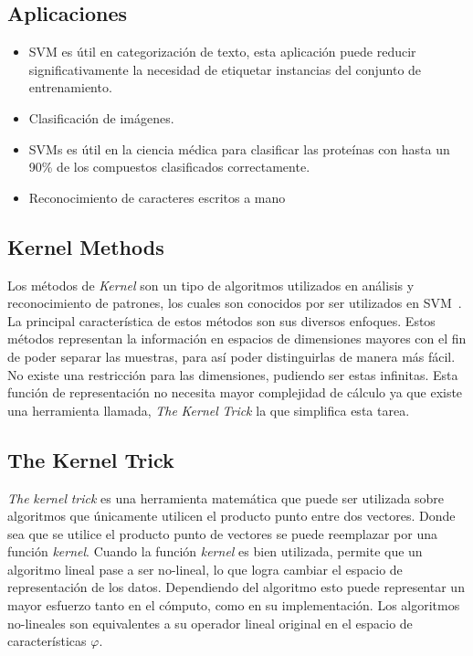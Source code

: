 \subsection{Aplicaciones}
\begin{itemize}
\item SVM es útil en categorización de texto, esta aplicación puede reducir significativamente la necesidad de etiquetar instancias del conjunto de entrenamiento.
\item Clasificación de imágenes.
\item SVMs es útil en la ciencia médica para clasificar las proteínas con hasta un 90\% de los compuestos clasificados correctamente.
\item Reconocimiento de caracteres escritos a mano
\end{itemize}

\subsection{Kernel Methods}\label{subsec:kernel_methods}

Los métodos de \textit{Kernel} son un tipo de algoritmos utilizados en análisis y reconocimiento de patrones, los cuales son conocidos por ser utilizados en SVM~\cite{kernels}. La principal característica de estos métodos son sus diversos enfoques. Estos métodos representan la información en espacios de dimensiones mayores con el fin de poder separar las muestras, para así poder distinguirlas de manera más fácil. No existe una restricción para las dimensiones, pudiendo ser estas infinitas. Esta función de representación no necesita mayor complejidad de cálculo ya que existe una herramienta llamada, \textit{The} \textit{Kernel} \textit{Trick} la que simplifica esta tarea.

\subsection{The Kernel Trick}

\textit{The} \textit{kernel} \textit{trick} es una herramienta matemática que puede ser utilizada sobre algoritmos que únicamente utilicen el producto punto entre dos vectores. Donde sea que se utilice el producto punto de vectores se puede reemplazar por una función \textit{kernel}. Cuando la función \textit{kernel} es bien utilizada, permite que un algoritmo lineal pase a ser no-lineal, lo que logra cambiar el espacio de representación de los datos. Dependiendo del algoritmo esto puede representar un mayor esfuerzo tanto en el cómputo, como en su implementación. Los algoritmos no-lineales son equivalentes a su operador lineal original en el espacio de características $\varphi$.

